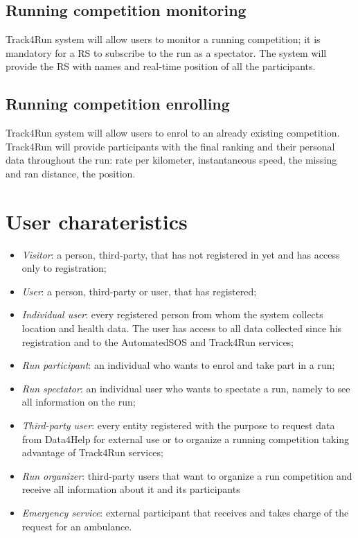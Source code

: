 \subsection{Running competition monitoring}
Track4Run system will allow users to monitor a running competition; it is mandatory for a RS to subscribe to the run as a spectator. The system will provide the RS with names and real-time position of all the participants.
\subsection{Running competition enrolling}
Track4Run system will allow users to enrol to an already existing competition. Track4Run will provide participants with the final ranking and their personal data throughout the run: rate per kilometer, instantaneous speed, the missing and ran distance, the position.

\section{User charateristics}
\begin{itemize}
\item	\textit{Visitor}: a person, third-party, that has not registered in yet and has access only to registration;
\item	\textit{User}:  a person, third-party or user, that has registered;
\item	\textit{Individual user}: every registered person from whom the system collects location and health data. The user has access to all data collected since his registration and to the AutomatedSOS and Track4Run services;
\item	\textit{Run participant}: an individual who wants to enrol and take part in a run;
\item	\textit{Run spectator}: an individual user who wants to spectate a run, namely to see all information on the run;
\item \textit{Third-party user}: every entity registered with the purpose to request data from Data4Help for external use or to organize a running competition taking advantage of Track4Run services;
\item	\textit{Run organizer}: third-party users that want to organize a run competition and receive all information about it and its participants
\item	\textit{Emergency service}: external participant that receives and takes charge of the request for an ambulance.
\end{itemize}

